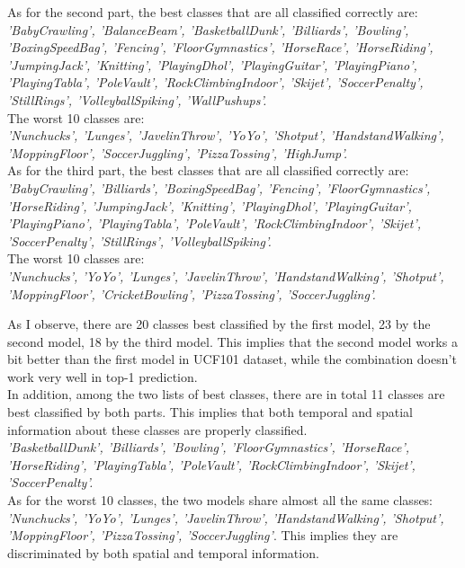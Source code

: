 \documentclass[15pt]{article}
\begin{document}
\noindent As for the second part, the best classes that are all classified correctly are:\\
\emph{'BabyCrawling', 'BalanceBeam', 'BasketballDunk', 'Billiards', 'Bowling', 'BoxingSpeedBag', 'Fencing', 'FloorGymnastics', 'HorseRace', 'HorseRiding', 'JumpingJack', 'Knitting', 'PlayingDhol', 'PlayingGuitar', 'PlayingPiano', 'PlayingTabla', 'PoleVault', 'RockClimbingIndoor', 'Skijet', 'SoccerPenalty', 'StillRings', 'VolleyballSpiking', 'WallPushups'.}\\
The worst 10 classes are:\\
\emph{'Nunchucks', 'Lunges', 'JavelinThrow', 'YoYo', 'Shotput', 'HandstandWalking', 'MoppingFloor', 'SoccerJuggling', 'PizzaTossing', 'HighJump'.}\\

\noindent As for the third part, the best classes that are all classified correctly are:\\
\emph{'BabyCrawling', 'Billiards', 'BoxingSpeedBag', 'Fencing', 'FloorGymnastics', 'HorseRiding', 'JumpingJack', 'Knitting', 'PlayingDhol', 'PlayingGuitar', 'PlayingPiano', 'PlayingTabla', 'PoleVault', 'RockClimbingIndoor', 'Skijet', 'SoccerPenalty', 'StillRings', 'VolleyballSpiking'.}\\
The worst 10 classes are:\\
\emph{'Nunchucks', 'YoYo', 'Lunges', 'JavelinThrow', 'HandstandWalking', 'Shotput', 'MoppingFloor', 'CricketBowling', 'PizzaTossing', 'SoccerJuggling'.}

\noindent As I observe, there are 20 classes best classified by the first model, 23 by the second model, 18 by the third model. This implies that the second model works a bit better than the first model in UCF101 dataset, while the combination doesn't work very well in top-1 prediction.\\
In addition, among the two lists of best classes, there are in total 11 classes are best classified by both parts. This implies that both temporal and spatial information about these classes are properly classified.\\
\emph{'BasketballDunk', 'Billiards', 'Bowling', 'FloorGymnastics', 'HorseRace', 'HorseRiding', 'PlayingTabla', 'PoleVault', 'RockClimbingIndoor', 'Skijet', 'SoccerPenalty'.}\\
As for the worst 10 classes, the two models share almost all the same classes: \emph{'Nunchucks', 'YoYo', 'Lunges', 'JavelinThrow', 'HandstandWalking', 'Shotput', 'MoppingFloor', 'PizzaTossing', 'SoccerJuggling'}. This implies they are discriminated by both spatial and temporal information.\\
\end{document}
